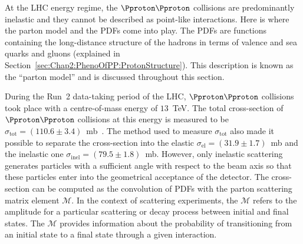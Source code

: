 At the LHC energy regime, the $\Pproton \Pproton$ collisions are predominantly
inelastic and they cannot be described as point-like interactions.
Here is where the parton model and the PDFs come into play.
The PDFs are functions containing the long-distance structure of the hadrons in 
terms of valence and sea quarks and gluons (explained in Section~\ref{sec:Chap2:PhenoOfPP:ProtonStructure}). 
This description is known as the ``parton model'' and is discussed throughout this section.

During the Run~2 data-taking period of the LHC, $\Pproton\Pproton$ collisions took place with a centre-of-mass 
energy of $13$~TeV. The total cross-section of $\Pproton\Pproton$ collisions at this energy is measured to 
be $\sigma_{\text{tot}} = (110.6 \pm 3.4)$~mb~\cite{Cafagna:2021sge}. The method used to measure $\sigma_{\text{tot}}$ also made it 
possible to separate the cross-section into the elastic $\sigma_{\text{el}} = (31.9 \pm 1.7)$~mb and 
the inelastic one $\sigma_{\text{inel}} = (79.5 \pm 1.8)$~mb.
However, only inelastic scattering generates particles with a sufficient angle with respect to the beam 
axis so that these particles enter into the geometrical acceptance of the detector. 
The cross-section can be computed as the convolution of PDFs with the parton 
scattering matrix element $\mathcal{M}$. 
In the context of scattering experiments, the $\mathcal{M}$ refers to the amplitude 
for a particular scattering or decay process between initial and final states. 
The $\mathcal{M}$ provides information about the probability of transitioning 
from an initial state to a final state through a given interaction.






